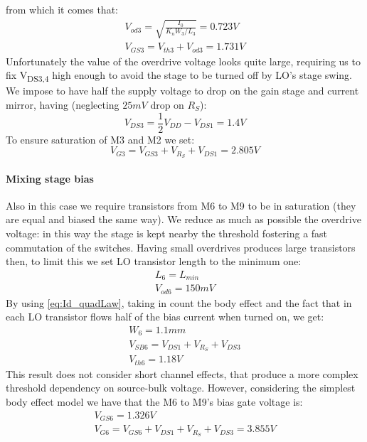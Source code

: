 from which it comes that:
\begin{gather}
	V_{od3}=\sqrt{\frac{I_0}{K_n W_3/L_3}} = 0.723 V \\
	V_{GS3} = V_{th3}+V_{od3} = 1.731 V
\end{gather}
Unfortunately the value of the overdrive voltage looks quite large, requiring us to fix V\textsubscript{DS3,4} high enough to avoid the stage to be turned off by LO's stage swing. We impose to have half the supply voltage to drop on the gain stage and current mirror, having (neglecting $25mV$ drop on $R_S$):
\begin{equation}
	V_{DS3} = \frac{1}{2}V_{DD}-V_{DS1} = 1.4 V
\end{equation}
To ensure saturation of M3 and M2 we set:
\begin{equation}
	V_{G3}=V_{GS3} +V_{R_{S}}+V_{DS1} = 2.805 V 
\end{equation}

\paragraph{Mixing stage bias}

Also in this case we require transistors from M6 to M9 to be in saturation (they are equal and biased the same way). We reduce as much as possible the overdrive voltage: in this way the stage is kept nearby the threshold fostering a fast commutation of the switches. Having small overdrives produces large transistors then, to limit this we set LO transistor length to the minimum one:
\begin{gather}
	L_6 = L_{min}  \\
	V_{od6} = 150mV 
\end{gather}
By using \ref{eq:Id_quadLaw}, taking in count the body effect and the fact that in each LO transistor flows half of the bias current when turned on, we get:
\begin{gather}
W_6 = 1.1mm \\
V_{SB6} = V_{DS1}+V_{R_S}+V_{DS3}\\
V_{th6} = 1.18V
\end{gather}
This result does not consider short channel effects, that produce a more complex threshold dependency on source-bulk voltage. However, considering the simplest body effect model we have that the M6 to M9's bias gate voltage is:
\begin{gather}
	V_{GS6}=1.326V \\
	V_{G6} = V_{GS6}+V_{DS1}+V_{R_S}+V_{DS3} = 3.855V
\end{gather}







